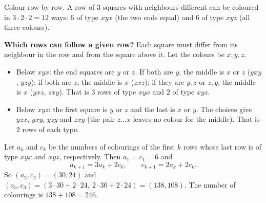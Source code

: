 Colour row by row. A row of $3$ squares with neighbours different can be coloured in $3\cdot2\cdot2=12$ ways: $6$ of type $xyx$ (the two ends equal) and $6$ of type $xyz$ (all three colours).

\textbf{Which rows can follow a given row?} Each square must differ from its neighbour in the row and from the square above it. Let the colours be $x,y,z$.
\begin{itemize}
\item Below $xyx$: the end squares are $y$ or $z$. If both are $y$, the middle is $x$ or $z$ ($yxy$, $yzy$); if both are $z$, the middle is $x$ ($zxz$); if they are $y,z$ or $z,y$, the middle is $x$ ($yxz$, $zxy$). That is $3$ rows of type $xyx$ and $2$ of type $xyz$.
\item Below $xyz$: the first square is $y$ or $z$ and the last is $x$ or $y$. The choices give $yzx$, $yxy$, $yzy$ and $zxy$ (the pair $z\ldots x$ leaves no colour for the middle). That is $2$ rows of each type.
\end{itemize}
Let $a_k$ and $c_k$ be the numbers of colourings of the first $k$ rows whose last row is of type $xyx$ and $xyz$, respectively. Then $a_1=c_1=6$ and
\[a_{k+1}=3a_k+2c_k,\qquad c_{k+1}=2a_k+2c_k.\]
So $(a_2,c_2)=(30,24)$ and $(a_3,c_3)=(3\cdot30+2\cdot24,\ 2\cdot30+2\cdot24)=(138,108)$. The number of colourings is $138+108=\boxed{246}$.
